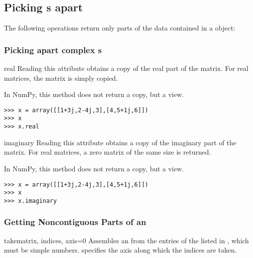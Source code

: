 \subsection{Picking s apart}
The following operations return only parts of the data contained in a
 object:
\subsubsection{Picking apart complex s}
\begin{memberdesc}[Array]{real}
  Reading this attribute obtains a copy of the real part of the matrix.
  For real matrices, the matrix is simply copied.

  In NumPy, this method does not return a copy, but a view.
\begin{verbatim}
>>> x = array([[1+3j,2-4j,3],[4,5+1j,6]])
>>> x
>>> x.real
\end{verbatim}
\end{memberdesc}

\begin{memberdesc}[Array]{imaginary}
  Reading this attribute obtains a copy of the imaginary part of the matrix.
  For real matrices, a zero matrix of the same size is returned.

  In NumPy, this method does not return a copy, but a view.
\begin{verbatim}
>>> x = array([[1+3j,2-4j,3],[4,5+1j,6]])
>>> x
>>> x.imaginary
\end{verbatim}
\end{memberdesc}
\subsubsection{Getting Noncontiguous Parts of an }
\begin{funcdesc}{take}{matrix, indices, axis=0}
  Assembles an  from the entries of the 
  listed in , which must be simple numbers. 
  specifies the axis along which the indices are taken.
\end{funcdesc}

